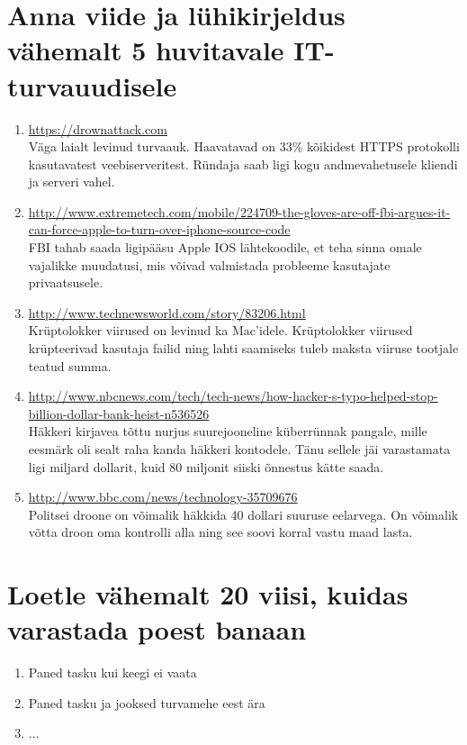 \documentclass{article}
\begin{document}
\begin{enumerate}
\section{Anna viide ja lühikirjeldus vähemalt 5 huvitavale IT-turvauudisele}
\begin{enumerate}
	\item{\url{https://drownattack.com}\\
		Väga laialt levinud turvaauk. Haavatavad on 33\% kõikidest HTTPS protokolli kasutavatest veebiserveritest. 
		Ründaja saab ligi kogu andmevahetusele kliendi ja serveri vahel.}
	\item{\url{http://www.extremetech.com/mobile/224709-the-gloves-are-off-fbi-argues-it-can-force-apple-to-turn-over-iphone-source-code}\\
		FBI tahab saada ligipääsu Apple IOS lähtekoodile, et teha sinna omale vajalikke muudatusi, mis võivad valmistada probleeme kasutajate privaatsusele.}
	\item{\url{http://www.technewsworld.com/story/83206.html}\\
		Krüptolokker viirused on levinud ka Mac'idele. Krüptolokker viirused krüpteerivad kasutaja failid ning lahti saamiseks tuleb maksta viiruse tootjale teatud summa.}
	\item{\url{http://www.nbcnews.com/tech/tech-news/how-hacker-s-typo-helped-stop-billion-dollar-bank-heist-n536526}\\
		Häkkeri kirjavea tõttu nurjus suurejooneline küberrünnak pangale, mille eesmärk oli sealt raha kanda häkkeri kontodele. Tänu sellele jäi varastamata ligi miljard dollarit, kuid 80 miljonit siiski õnnestus kätte saada.}
	\item{\url{http://www.bbc.com/news/technology-35709676}\\
		Politsei droone on võimalik häkkida 40 dollari suuruse eelarvega. On võimalik võtta droon oma kontrolli alla ning see soovi korral vastu maad lasta.}
\end{enumerate}

\section{Loetle vähemalt 20 viisi, kuidas varastada poest banaan}
\begin{enumerate}
	\item{Paned tasku kui keegi ei vaata}
	\item{Paned tasku ja jooksed turvamehe eest ära}
	\item{...}
\end{enumerate}


\end{enumerate}
\end{document}
